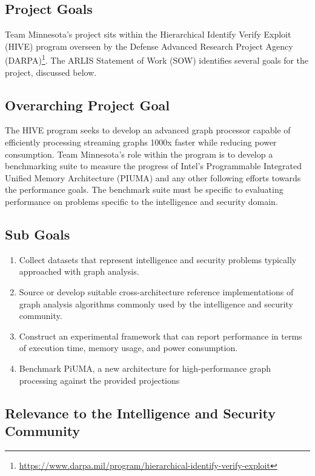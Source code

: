 \documentclass[letterpaper, 10pt]{article}
\begin{document}
\begin{multicols}{2}    
    \section{Project Goals}\label{section:goals}
    Team Minnesota's project sits within the Hierarchical Identify Verify Exploit (HIVE) program overseen by the Defense Advanced Research Project Agency (DARPA)\footnote{\href{https://www.darpa.mil/program/hierarchical-identify-verify-exploit}{https://www.darpa.mil/program/hierarchical-identify-verify-exploit}}. The ARLIS Statement of Work (SOW) identifies several goals for the project, discussed below. 
        \subsection{Overarching Project Goal}\label{section:projectGoal}
        The HIVE program seeks to develop an advanced graph processor capable of efficiently processing streaming graphs 1000x faster while reducing power consumption. 
        Team Minnesota's role within the program is to develop a benchmarking suite to measure the progress of Intel's Programmable Integrated Unified Memory Architecture (PIUMA) and any other following efforts towards the performance goals. 
        The benchmark suite must be specific to evaluating performance on problems specific to the intelligence and security domain.
        \subsection{Sub Goals}\label{section:subGoals}
        \begin{enumerate}
        \item Collect datasets that represent intelligence and security problems typically approached with graph analysis. 
        \item Source or develop suitable cross-architecture reference implementations of graph analysis algorithms commonly used by the intelligence and security community. 
        \item Construct an experimental framework that can report performance in terms of execution time, memory usage, and power consumption.
        \item Benchmark PiUMA, a new architecture for high-performance graph processing against the provided projections 
        \end{enumerate}

        \subsection{Relevance to the Intelligence and Security Community} \label{section:relevance}
        

\end{multicols}
\end{document}
